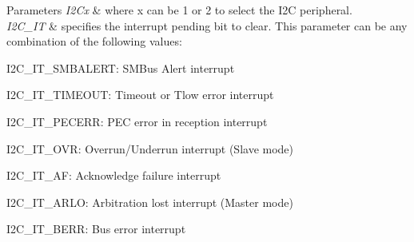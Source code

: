 \begin{DoxyParams}{Parameters}
{\em I2\+Cx} & where x can be 1 or 2 to select the I2C peripheral. \\
\hline
{\em I2\+C\+\_\+\+IT} & specifies the interrupt pending bit to clear. This parameter can be any combination of the following values\+: \begin{DoxyItemize}
\item I2\+C\+\_\+\+I\+T\+\_\+\+S\+M\+B\+A\+L\+E\+RT\+: S\+M\+Bus Alert interrupt \item I2\+C\+\_\+\+I\+T\+\_\+\+T\+I\+M\+E\+O\+UT\+: Timeout or Tlow error interrupt \item I2\+C\+\_\+\+I\+T\+\_\+\+P\+E\+C\+E\+RR\+: P\+EC error in reception interrupt \item I2\+C\+\_\+\+I\+T\+\_\+\+O\+VR\+: Overrun/\+Underrun interrupt (Slave mode) \item I2\+C\+\_\+\+I\+T\+\_\+\+AF\+: Acknowledge failure interrupt \item I2\+C\+\_\+\+I\+T\+\_\+\+A\+R\+LO\+: Arbitration lost interrupt (Master mode) \item I2\+C\+\_\+\+I\+T\+\_\+\+B\+E\+RR\+: Bus error interrupt\end{DoxyItemize}
\\
\hline
\end{DoxyParams}
